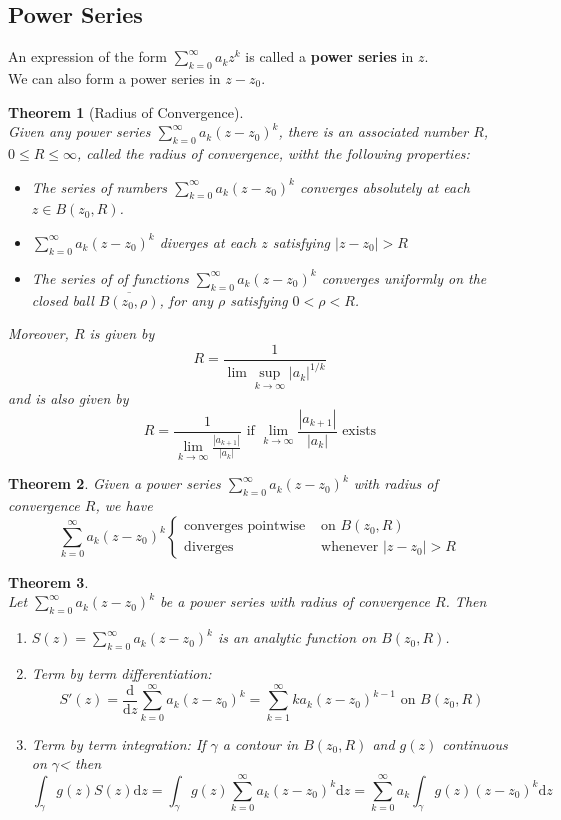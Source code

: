 \documentclass[12pt]{article}
\newcommand{\diff}{\mathrm{d}}
\newtheorem{theorem}{Theorem}[section]
\theoremstyle{definition}
\begin{document}
\subsection{Power Series}
An expression of the form $\sum_{k=0}^\infty a_kz^k$ is called a \textbf{power series} in $z$.\\
We can also form a power series in $z-z_0$.
\begin{theorem}[Radius of Convergence]
\hfill\\\normalfont Given any power series $\sum_{k=0}^\infty a_k(z-z_0)^k$, there is an associated number $R$, $0\leq R\leq \infty$, called the radius of convergence, witht the following properties:
\begin{itemize}
	\item The series of numbers $\sum_{k=0}^\infty a_k(z-z_0)^k$ converges absolutely at each $z\in B(z_0, R)$.
	\item $\sum_{k=0}^\infty a_k(z-z_0)^k$ diverges at each $z$ satisfying $|z-z_0|>R$
	\item The series of of functions $\sum_{k=0}^\infty a_k(z-z_0)^k$ converges uniformly on the closed ball $\overline{B(z_0, \rho)}$, for any $\rho$ satisfying $0<\rho<R$.
\end{itemize}
Moreover, $R$ is given by
\[
R=\frac{1}{\lim\sup_{k\to\infty} |a_k|^{1/k}}
\]
and is also given by
\[
R=\frac{1}{\lim_{k\to\infty}\frac{|a_{k+1}|}{|a_k|}} \text{ if }\lim_{k\to\infty} \frac{|a_{k+1}|}{|a_k|}\text{ exists}
\]
\end{theorem}
\begin{theorem}\normalfont Given a power series $\sum_{k=0}^\infty a_k(z-z_0)^k$ with radius of convergence $R$, we have
\[
\sum_{k=0}^\infty a_k(z-z_0)^k\begin{cases}
\text{converges pointwise} & \text{ on }B(z_0, R)\\
\text{diverges} & \text{ whenever }|z-z_0|>R
\end{cases}
\]
\end{theorem}
\begin{theorem}\hfill\\\normalfont Let $\sum_{k=0}^\infty a_k(z-z_0)^k$ be a power series with radius of convergence $R$. Then
\begin{enumerate}
	\item $S(z)=\sum_{k=0}^\infty a_k(z-z_0)^k$ is an analytic function on $B(z_0, R)$.
	\item Term by term differentiation: 
	\[
S'(z) = \frac{\diff }{\diff z}\sum_{k=0}^\infty a_k(z-z_0)^k = \sum_{k=1}^\infty k a_k (z-z_0)^{k-1}\text{ on }B(z_0, R)
\]
	\item Term by term integration: If $\gamma$ a contour in $B(z_0, R)$ and $g(z)$ continuous on $\gamma$< then
	\[
\int_\gamma g(z)S(z)\diff z = \int_\gamma g(z)\sum_{k=0}^\infty a_k(z-z_0)^k\diff z = \sum_{k=0}^\infty a_k\int_\gamma g(z)(z-z_0)^k\diff z
	\]
\end{enumerate}
\end{theorem}
\end{document}
